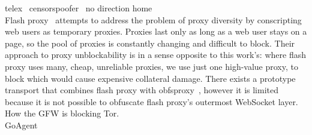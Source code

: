 \documentclass{article}
\begin{document}
telex~\cite{telex} censorspoofer~\cite{censorspoofer} no direction home~\cite{nodirectionhome}
\\

Flash proxy~\cite{flashproxy-pets12} attempts to address the problem of proxy
diversity by conscripting web users as temporary proxies. Proxies last only as
long as a web user stays on a page, so the pool of proxies is constantly
changing and difficult to block. Their approach to proxy unblockability is in a
sense opposite to this work's: where flash proxy uses many, cheap, unreliable
proxies, we use just one high-value proxy, to block which would cause expensive
collateral damage. There exists a prototype transport that combines flash proxy
with obfsproxy~\cite{obfs-flash}, however it is limited because it is not
possible to obfuscate flash proxy's outermost WebSocket layer.\\

How the GFW is blocking Tor. \cite{foci12-winter}\\

GoAgent\\


 

\end{document}
